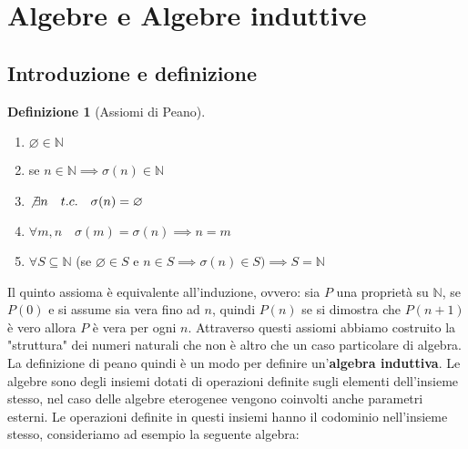 \documentclass{article}
\theoremstyle{definition}
\theoremstyle{definition}
\theoremstyle{definition}
\newtheorem{definition}[theorem]{Definizione}
\theoremstyle{remark}
\begin{document}
\section{Algebre e Algebre induttive}
\subsection{Introduzione e definizione}
\begin{definition}[Assiomi di Peano]
    \leavevmode\newline
    \begin{enumerate}
        \renewcommand{\labelenumi}{\Roman{enumi}.}
        \item $\varnothing  \in \mathbb{N}$
        \item  se $n\in\mathbb{N}\implies \sigma(n)\in\mathbb{N}$
        \item $\not\exists n\quad t.c.\quad \sigma(n)= \varnothing$
        \item $\forall m,n \quad \sigma(m)=\sigma(n)\implies n = m$
        \item $\forall S\subseteq \mathbb{N}$ (se $\varnothing \in S$ e $n\in S \implies \sigma(n)\in S)\implies S=\mathbb{N}$
    \end{enumerate}
\end{definition}
Il quinto assioma è equivalente all'induzione, ovvero: sia $P$ una proprietà su $\mathbb{N}$, se $P(0)$ e si assume sia vera fino ad $n$, quindi
$P(n)$ se si dimostra che $P(n+1)$ è vero allora $P$ è vera per ogni $n$. Attraverso questi assiomi abbiamo costruito la "struttura" dei numeri naturali che non è altro che un caso particolare di algebra.
La definizione di peano quindi è un modo per definire un'\textbf{algebra induttiva}. Le algebre sono degli insiemi dotati di operazioni
definite sugli elementi dell'insieme stesso, nel caso delle algebre eterogenee vengono coinvolti anche parametri esterni. Le operazioni definite in questi insiemi
hanno il codominio nell'insieme stesso, consideriamo ad esempio la seguente algebra:
\end{document}
